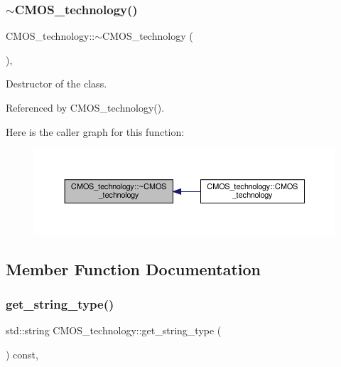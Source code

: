 \subsubsection{\texorpdfstring{$\sim$\+C\+M\+O\+S\+\_\+technology()}{~CMOS\_technology()}}
{\footnotesize\ttfamily C\+M\+O\+S\+\_\+technology\+::$\sim$\+C\+M\+O\+S\+\_\+technology (\begin{DoxyParamCaption}{ }\end{DoxyParamCaption})\hspace{0.3cm}{\ttfamily [override]}, {\ttfamily [default]}}



Destructor of the class. 



Referenced by C\+M\+O\+S\+\_\+technology().

Here is the caller graph for this function\+:
\nopagebreak
\begin{figure}[H]
\begin{center}
\leavevmode
\includegraphics[width=350pt]{de/da2/classCMOS__technology_aac71ba52c2e5fd3a0883366b603fc375_icgraph}
\end{center}
\end{figure}


\subsection{Member Function Documentation}
\mbox{\label{classCMOS__technology_a068946d67529fe475c1943b0450c4110}} 
\subsubsection{\texorpdfstring{get\+\_\+string\+\_\+type()}{get\_string\_type()}}
{\footnotesize\ttfamily std\+::string C\+M\+O\+S\+\_\+technology\+::get\+\_\+string\+\_\+type (\begin{DoxyParamCaption}{ }\end{DoxyParamCaption}) const\hspace{0.3cm}{\ttfamily [override]}, {\ttfamily [virtual]}}



